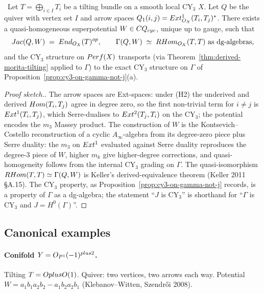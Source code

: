 \begin{theorem}
\label{thm:tilting-jacobi}
\ClaimStatusTheorem\ Let $T = \bigoplus_{i \in I} T_i$ be a tilting bundle on a
smooth local CY$_3$ $X$. Let $Q$ be the quiver with vertex set $I$ and arrow
spaces $Q_1(i,j) = Ext^{1}_{O_X}(T_i, T_j)^{*}$. There exists a
quasi-homogeneous superpotential $W \in C Q_{cyc}$, unique up to
gauge, such that
\[
  Jac(Q, W) \;=\; End_{O_X}(T)^{op},
  \qquad
  \Gamma(Q, W) \;\simeq\; RHom_{O_X}(T, T) \text{ as dg-algebras},
\]
and the CY$_3$ structure on $Perf(X)$ transports (via
Theorem~\ref{thm:derived-morita-tilting} applied to $\Gamma$) to the exact
CY$_3$ structure on $\Gamma$ of Proposition~\ref{prop:cy3-on-gamma-not-j}(a).
\end{theorem}

\begin{proof}[Proof sketch.]
The arrow spaces are Ext-spaces: under (H2) the underived and derived
$Hom(T_i, T_j)$ agree in degree zero, so the first non-trivial term for
$i \neq j$ is $Ext^{1}(T_i, T_j)$, which Serre-dualises to
$Ext^{2}(T_j, T_i)$ on the CY$_3$; the potential encodes the $m_3$ Massey
product. The construction of $W$ is the Kontsevich--Costello
reconstruction of a cyclic $A_\infty$-algebra from its degree-zero piece plus
Serre duality: the $m_3$ on $Ext^1$ evaluated against Serre duality
reproduces the degree-3 piece of $W$, higher $m_k$ give higher-degree
corrections, and quasi-homogeneity follows from the internal CY$_3$ grading
on $\Gamma$. The quasi-isomorphism $RHom(T, T) \simeq \Gamma(Q, W)$ is
Keller's derived-equivalence theorem (Keller 2011 \S A.15). The CY$_3$
property, as Proposition~\ref{prop:cy3-on-gamma-not-j} records, is a property
of $\Gamma$ as a dg-algebra; the statement ``$J$ is CY$_3$'' is shorthand for
``$\Gamma$ is CY$_3$ and $J = H^0(\Gamma)$''.
\end{proof}

\subsection*{Canonical examples}

\paragraph{Conifold $Y = O_{P^1}(-1)^{plus 2}$.} Tilting
$T = O plus O(1)$. Quiver: two vertices, two arrows each way. Potential
$W = a_1 b_1 a_2 b_2 - a_1 b_2 a_2 b_1$ (Klebanov--Witten, Szendr\H{o}i 2008).

